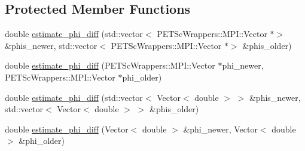 \subsection*{Protected Member Functions}
\begin{DoxyCompactItemize}
\item 
double \hyperlink{class_iteration_base_a8bcba214850c5d47f5ae38fb98f51a44}{estimate\+\_\+phi\+\_\+diff} (std\+::vector$<$ P\+E\+T\+Sc\+Wrappers\+::\+M\+P\+I\+::\+Vector $\ast$$>$ \&phis\+\_\+newer, std\+::vector$<$ P\+E\+T\+Sc\+Wrappers\+::\+M\+P\+I\+::\+Vector $\ast$$>$ \&phis\+\_\+older)
\item 
double \hyperlink{class_iteration_base_a5b823c5dda090e64bdba2abb815dfbf6}{estimate\+\_\+phi\+\_\+diff} (P\+E\+T\+Sc\+Wrappers\+::\+M\+P\+I\+::\+Vector $\ast$phi\+\_\+newer, P\+E\+T\+Sc\+Wrappers\+::\+M\+P\+I\+::\+Vector $\ast$phi\+\_\+older)
\item 
double \hyperlink{class_iteration_base_aa929c0e69fd2566db98611b810354123}{estimate\+\_\+phi\+\_\+diff} (std\+::vector$<$ Vector$<$ double $>$ $>$ \&phis\+\_\+newer, std\+::vector$<$ Vector$<$ double $>$ $>$ \&phis\+\_\+older)
\item 
double \hyperlink{class_iteration_base_ab46bde988ac6dc1b84ebb78665414785}{estimate\+\_\+phi\+\_\+diff} (Vector$<$ double $>$ \&phi\+\_\+newer, Vector$<$ double $>$ \&phi\+\_\+older)
\end{DoxyCompactItemize}

